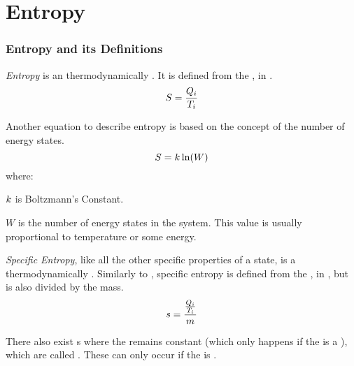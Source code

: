 \section{Entropy}\label{sec:Entropy}


\subsubsection{Entropy and its Definitions}\label{subsec:Entropy_Definitions}
\begin{definition}[Entropy]\label{def:Entropy}
  \emph{Entropy} is an thermodynamically .
  It is defined from the , in .
  \begin{equation}\label{eq:Entropy}
    S = \frac{Q_{i}}{T_{i}}
  \end{equation}

  Another equation to describe entropy is based on the concept of the number of energy states.
  \begin{equation}\label{eq:Entropy_Energy_States}
    S = k \ln(W)
  \end{equation}
  where:
  \begin{description}[noitemsep]
  \item $k$ is Boltzmann's Constant.
  \item $W$ is the number of energy states in the system.
    This value is usually proportional to temperature or some energy.
  \end{description}
\end{definition}

\begin{definition}\label{def:Specific_Entropy}
  \emph{Specific Entropy}, like all the other specific properties of a state, is a thermodynamically .
  Similarly to , specific entropy is defined from the , in , but is also divided by the mass.
  \begin{equation}\label{eq:Entropy}
    s = \frac{\frac{Q_{i}}{T_{i}}}{m}
  \end{equation}
\end{definition}

There also exist s where the  remains constant (which only happens if the  is a ), which are called .
These can only occur if the  is .

